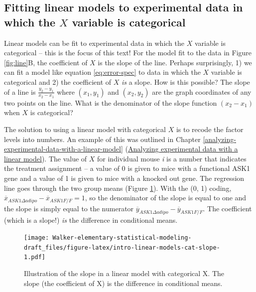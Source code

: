 \documentclass[]{book}
\begin{document}
\hypertarget{fitting-linear-models-to-experimental-data-in-which-the-x-variable-is-categorical}{%
\subsection{\texorpdfstring{Fitting linear models to experimental data in which the \(X\) variable is categorical}{Fitting linear models to experimental data in which the X variable is categorical}}\label{fitting-linear-models-to-experimental-data-in-which-the-x-variable-is-categorical}}

Linear models can be fit to experimental data in which the \(X\) variable is categorical -- this is the focus of this text! For the model fit to the data in Figure \ref{fig:line}B, the coefficient of \(X\) is the slope of the line. Perhaps surprisingly, 1) we can fit a model like equation \eqref{eq:error-spec} to data in which the \(X\) variable is categorical and 2) the coefficient of \(X\) \emph{is} a slope. How is this possible? The slope of a line is \(\frac{y_2 - y_1}{x_2 - x_1}\) where \((x_1, y_1)\) and \((x_2, y_2)\) are the graph coordinates of any two points on the line. What is the denominator of the slope function \((x_2 - x_1)\) when \(X\) is categorical?

The solution to using a linear model with categorical \(X\) is to recode the factor levels into numbers. An example of this was outlined in Chapter \ref{analyzing-experimental-data-with-a-linear-model} (\protect\hyperlink{analyzing-experimental-data-with-a-linear-model}{Analyzing experimental data with a linear model}). The value of \(X\) for individual mouse \emph{i} is a number that indicates the treatment assignment -- a value of 0 is given to mice with a functional ASK1 gene and a value of 1 is given to mice with a knocked out gene. The regression line goes through the two group means (Figure \ref{fig:intro-linear-models-cat-slope}). With the (0, 1) coding, \(\overline{x}_{ASK1Δadipo} - \overline{x}_{ASK1F/F} = 1\), so the denominator of the slope is equal to one and the slope is simply equal to the numerator \(\overline{y}_{ASK1Δadipo} - \overline{y}_{ASK1F/F}\). The coefficient (which is a slope!) \emph{is} the difference in conditional means.

\begin{figure}
\centering
\texttt{[image: Walker-elementary-statistical-modeling-draft\_files/figure-latex/intro-linear-models-cat-slope-1.pdf]}
\caption{\label{fig:intro-linear-models-cat-slope}Illustration of the slope in a linear model with categorical X. The slope (the coefficient of X) is the difference in conditional means.}
\end{figure}
\end{document}
